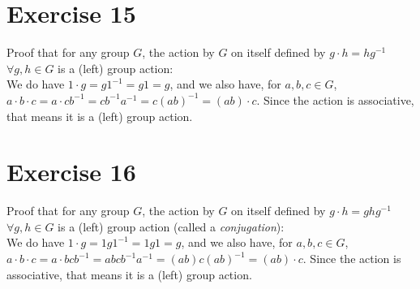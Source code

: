 \documentclass{article}
\begin{document}
    \section*{Exercise 15}
    Proof that for any group $G$, the action by $G$ on itself
    defined by $g \cdot h = hg^{-1}$ $\forall g, h \in G$
    is a (left) group action: \\
    We do have $1 \cdot g = g1^{-1} = g1 = g$,
    and we also have, for $a, b, c \in G$,
    $a \cdot b \cdot c = a \cdot cb^{-1}
    = cb^{-1}a^{-1}
    = c(ab)^{-1}
    = (ab) \cdot c$.
    Since the action is associative,
    that means it is a (left) group action.


    \section*{Exercise 16}
    Proof that for any group $G$, the action by $G$ on itself
    defined by $g \cdot h = ghg^{-1}$ $\forall g, h \in G$
    is a (left) group action (called a \textit{conjugation}): \\
    We do have $1 \cdot g = 1g1^{-1} = 1g1 = g$,
    and we also have, for $a, b, c \in G$,
    $a \cdot b \cdot c = a \cdot bcb^{-1}
    = abcb^{-1}a^{-1}
    = (ab)c(ab)^{-1}
    = (ab) \cdot c$.
    Since the action is associative,
    that means it is a (left) group action.
\end{document}
